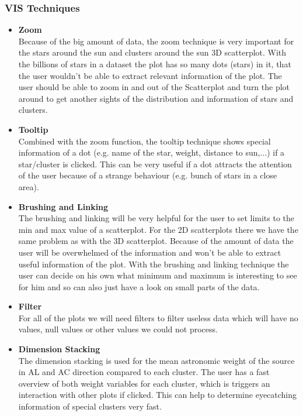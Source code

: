 \documentclass{article}
\begin{document}
\subsubsection{VIS Techniques}
\begin{itemize}
\item \textbf{Zoom} \\
Because of the big amount of data, the zoom technique is very important for the stars around the sun and clusters around the sun 3D scatterplot. With the billions of stars in a dataset the plot has so many dots (stars) in it, that the user wouldn't be able to extract relevant information of the plot. The user should be able to zoom in and out of the Scatterplot and turn the plot around to get another sights of the distribution and information of stars and clusters.

\item \textbf{Tooltip} \\
Combined with the zoom function, the tooltip technique shows special information of a dot (e.g. name of the star, weight, distance to sun,...) if a star/cluster is clicked. This can be very useful if a dot attracts the attention of the user because of a strange behaviour (e.g. bunch of stars in a close area).

\item \textbf{Brushing and Linking} \\
The brushing and linking will be very helpful for the user to set limits to the min and max value of a scatterplot. For the 2D scatterplots there we have the same problem as with the 3D scatterplot. Because of the amount of data the user will be overwhelmed of the information and won't be able to extract useful information of the plot. With the brushing and linking technique the user can decide on his own what minimum and maximum is interesting to see for him and so can also just have a look on small parts of the data.

\item \textbf{Filter} \\
For all of the plots we will need filters to filter useless data which will have no values, null values or other values we could not process.

\item \textbf{Dimension Stacking} \\
The dimension stacking is used for the mean astronomic weight of the source in AL and AC direction compared to each cluster. The user has a fast overview of both weight variables for each cluster, which is triggers an interaction with other plots if clicked. This can help to determine eyecatching information of special clusters very fast.
\end{itemize}
\end{document}
